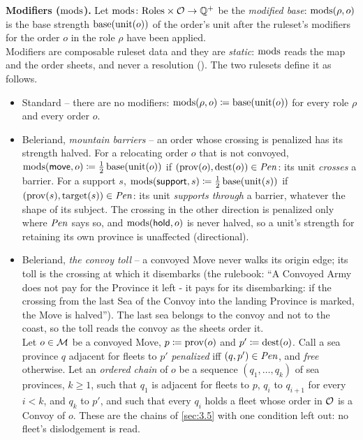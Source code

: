\documentclass[12pt,a4paper]{article}
\begin{document}
\textbf{Modifiers ($\operatorname{mods}$).}
Let $\operatorname{mods}\colon \mathrm{Roles} \times \mathcal{O} \to \mathbb{Q}^{+}$ be the \emph{modified base}: $\operatorname{mods}(\rho, o)$ is the base strength $\operatorname{base}(\operatorname{unit}(o))$ of the order's unit after the ruleset's modifiers for the order $o$ in the role $\rho$ have been applied.\\
Modifiers are composable ruleset data and they are \emph{static}: $\operatorname{mods}$ reads the map and the order sheets, and never a resolution ().
The two rulesets define it as follows.
\begin{itemize}
\item Standard -- there are no modifiers: $\operatorname{mods}(\rho, o) \coloneqq \operatorname{base}(\operatorname{unit}(o))$ for every role $\rho$ and every order $o$.
\item Beleriand, \emph{mountain barriers} -- an order whose crossing is penalized has its strength halved.
For a relocating order $o$ that is not convoyed, $\operatorname{mods}(\mathsf{move}, o) \coloneqq \tfrac{1}{2}\operatorname{base}(\operatorname{unit}(o))$ if $(\operatorname{prov}(o), \operatorname{dest}(o)) \in \mathit{Pen}$: its unit \emph{crosses} a barrier.
For a support $s$, $\operatorname{mods}(\mathsf{support}, s) \coloneqq \tfrac{1}{2}\operatorname{base}(\operatorname{unit}(s))$ if $(\operatorname{prov}(s), \operatorname{target}(s)) \in \mathit{Pen}$: its unit \emph{supports through} a barrier, whatever the shape of its subject.
The crossing in the other direction is penalized only where $\mathit{Pen}$ says so, and $\operatorname{mods}(\mathsf{hold}, o)$ is never halved, so a unit's strength for retaining its own province is unaffected (directional).
\item Beleriand, \emph{the convoy toll} -- a convoyed Move never walks its origin edge; its toll is the crossing at which it disembarks (the rulebook: ``A Convoyed Army does not pay for the Province it left - it pays for its disembarking: if the crossing from the last Sea of the Convoy into the landing Province is marked, the Move is halved'').
The last sea belongs to the convoy and not to the coast, so the toll reads the convoy as the sheets order it.\\
Let $o \in \mathcal{M}$ be a convoyed Move, $p \coloneqq \operatorname{prov}(o)$ and $p' \coloneqq \operatorname{dest}(o)$.
Call a sea province $q$ adjacent for fleets to $p'$ \emph{penalized} iff $(q, p') \in \mathit{Pen}$, and \emph{free} otherwise.
Let an \emph{ordered chain} of $o$ be a sequence $(q_1, \dots, q_k)$ of sea provinces, $k \ge 1$, such that $q_1$ is adjacent for fleets to $p$, $q_i$ to $q_{i+1}$ for every $i < k$, and $q_k$ to $p'$, and such that every $q_i$ holds a fleet whose order in $\mathcal{O}$ is a Convoy of $o$.
These are the chains of \cref{sec:3.5} with one condition left out: no fleet's dislodgement is read.\\

\end{itemize}
\end{document}
